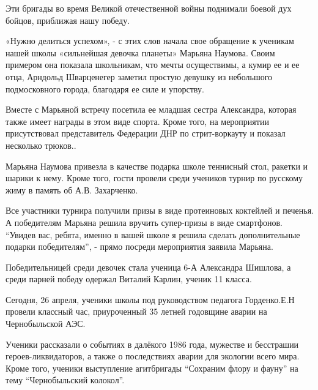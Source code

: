 Эти бригады во время Великой отечественной войны поднимали боевой дух бойцов,
приближая нашу победу.



«Нужно делиться успехом», - с этих слов начала свое обращение к ученикам нашей
школы «сильнейшая девочка планеты» Марьяна Наумова. Своим примером она показала
школьникам, что мечты осуществимы, а кумир ее и ее отца, Арндольд Шварценегер
заметил простую девушку из небольшого подмосковного города, благодаря ее силе и
упорству.

Вместе с Марьяной встречу посетила ее младшая сестра Александра, которая также
имеет награды в этом виде спорта. Кроме того, на мероприятии присутствовал
представитель Федерации ДНР по стрит-воркауту и показал несколько трюков..

Марьяна Наумова привезла в качестве подарка школе теннисный стол, ракетки и
шарики к нему. Кроме того, гости провели среди учеников турнир по русскому жиму
в память об А.В. Захарченко.

Все участники турнира получили призы в виде протеиновых коктейлей и печенья. А
победителям Марьяна решила вручить супер-призы в виде смартфонов. \enquote{Увидев вас,
ребята, именно в вашей школе я решила сделать дополнительные подарки
победителям}, - прямо посреди мероприятия заявила Марьяна.

Победительницей среди девочек стала ученица 6-А Александра Шишлова, а среди
парней победу одержал Виталий Карлин, ученик 11 класса.



Сегодня, 26 апреля, ученики школы под руководством педагога Горденко.Е.Н
провели классный час, приуроченный 35 летней годовщине аварии на Чернобыльской
АЭС.

Ученики рассказали о событиях в далёкого 1986 года, мужестве и бесстрашии
героев-ликвидаторов, а также о последствиях аварии для экологии всего мира.
Кроме того, ученики  выступление агитбригады \enquote{Сохраним флору и фауну}
на тему \enquote{Чернобыльский колокол}.


